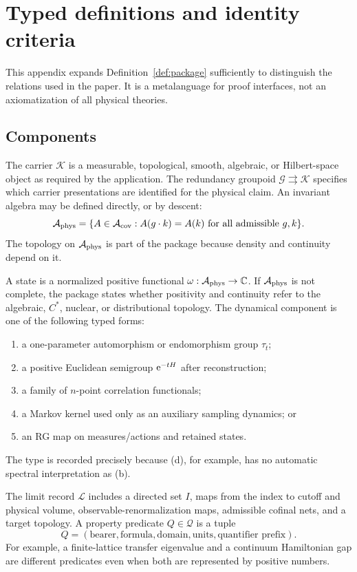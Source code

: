 \section{Typed definitions and identity criteria}
\label{app:typed}

This appendix expands Definition~\ref{def:package} sufficiently to distinguish
the relations used in the paper.  It is a metalanguage for proof interfaces,
not an axiomatization of all physical theories.

\subsection{Components}

The carrier $\mathcal K$ is a measurable, topological, smooth, algebraic, or
Hilbert-space object as required by the application.  The redundancy
groupoid $\mathcal G\rightrightarrows\mathcal K$ specifies which carrier
presentations are identified for the physical claim.  An invariant algebra
may be defined directly, or by descent:
\[
 \mathcal A_{\mathrm{phys}}=\{A\in\mathcal A_{\mathrm{cov}}:
  A(g\cdot k)=A(k)\ \text{for all admissible }g,k\}.
\]
The topology on $\mathcal A_{\mathrm{phys}}$ is part of the package because density and
continuity depend on it.

A state is a normalized positive functional
$\omega:\mathcal A_{\mathrm{phys}}\to\mathbb C$.  If $\mathcal A_{\mathrm{phys}}$ is not complete, the package states
whether positivity and continuity refer to the algebraic, $C^*$, nuclear, or
distributional topology.  The dynamical component is one of the following
typed forms:
\begin{enumerate}[label=(\alph*),itemsep=2pt]
 \item a one-parameter automorphism or endomorphism group $\tau_t$;
 \item a positive Euclidean semigroup $\mathrm e^{-tH}$ after reconstruction;
 \item a family of $n$-point correlation functionals;
 \item a Markov kernel used only as an auxiliary sampling dynamics; or
 \item an RG map on measures/actions and retained states.
\end{enumerate}
The type is recorded precisely because (d), for example, has no automatic
spectral interpretation as (b).

The limit record $\mathcal L$ includes a directed set $I$, maps from the index
to cutoff and physical volume, observable-renormalization maps, admissible
cofinal nets, and a target topology.  A property predicate $Q\in\mathcal Q$
is a tuple
\[
 Q=(\text{bearer},\text{formula},\text{domain},\text{units},
     \text{quantifier prefix}).
\]
For example, a finite-lattice transfer eigenvalue and a continuum Hamiltonian
gap are different predicates even when both are represented by positive
numbers.

